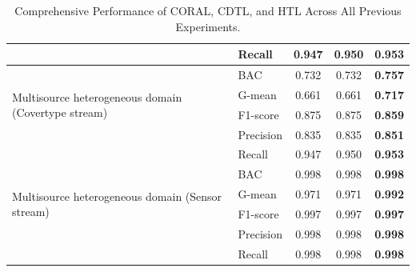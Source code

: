 \begin{table}[h]
{\begin{tabular}{|l|l|c|c|c|}
                                                 & Recall          & 0.947          & 0.950         & \textbf{0.953} \\ \hline
  \multirow{4}{*}{Multisource heterogeneous domain (Covertype stream)} & BAC & 0.732  & 0.732         & \textbf{0.757} \\ \cline{2-5} 
                                                 & G-mean          & 0.661          & 0.661         & \textbf{0.717} \\ \cline{2-5} 
                                                 & F1-score        & 0.875          & 0.875         & \textbf{0.859} \\ \cline{2-5} 
                                                 & Precision       & 0.835          & 0.835         & \textbf{0.851} \\ \cline{2-5} 
                                                 & Recall          & 0.947          & 0.950         & \textbf{0.953} \\ \hline
  \multirow{4}{*}{Multisource heterogeneous domain (Sensor stream)} & BAC & 0.998  & 0.998         & \textbf{0.998} \\ \cline{2-5} 
                                                 & G-mean          & 0.971          & 0.971         & \textbf{0.992} \\ \cline{2-5} 
                                                 & F1-score        & 0.997          & 0.997         & \textbf{0.997} \\ \cline{2-5} 
                                                 & Precision       & 0.998          & 0.998         & \textbf{0.998} \\ \cline{2-5} 
                                                 & Recall          & 0.998          & 0.998         & \textbf{0.998} \\ \hline
  \end{tabular}
  }
  \caption{Comprehensive Performance of CORAL, CDTL, and HTL Across All Previous Experiments.}

  \label{table:6_table2}
  \end{table}


